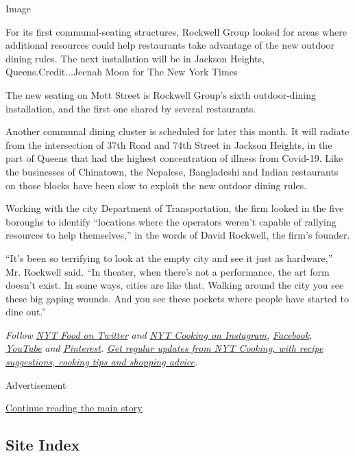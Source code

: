 Image

For its first communal-seating structures, Rockwell Group looked for
areas where additional resources could help restaurants take advantage
of the new outdoor dining rules. The next installation will be in
Jackson Heights, Queens.Credit...Jeenah Moon for The New York Times

The new seating on Mott Street is Rockwell Group's sixth outdoor-dining
installation, and the first one shared by several restaurants.

Another communal dining cluster is scheduled for later this month. It
will radiate from the intersection of 37th Road and 74th Street in
Jackson Heights, in the part of Queens that had the highest
concentration of illness from Covid-19. Like the businesses of
Chinatown, the Nepalese, Bangladeshi and Indian restaurants on those
blocks have been slow to exploit the new outdoor dining rules.

Working with the city Department of Transportation, the firm looked in
the five boroughs to identify ``locations where the operators weren't
capable of rallying resources to help themselves,'' in the words of
David Rockwell, the firm's founder.

``It's been so terrifying to look at the empty city and see it just as
hardware,'' Mr. Rockwell said. ``In theater, when there's not a
performance, the art form doesn't exist. In some ways, cities are like
that. Walking around the city you see these big gaping wounds. And you
see these pockets where people have started to dine out.''

\emph{Follow} \href{https://twitter.com/nytfood}{\emph{NYT Food on
Twitter}} \emph{and}
\href{https://www.instagram.com/nytcooking/}{\emph{NYT Cooking on
Instagram}}\emph{,}
\href{https://www.facebookcorewwwi.onion/nytcooking/}{\emph{Facebook}}\emph{,}
\href{https://www.youtube.com/nytcooking}{\emph{YouTube}} \emph{and}
\href{https://www.pinterest.com/nytcooking/}{\emph{Pinterest}}\emph{.}
\href{https://www.nytimes3xbfgragh.onion/newsletters/cooking}{\emph{Get
regular updates from NYT Cooking, with recipe suggestions, cooking tips
and shopping advice}}\emph{.}

Advertisement

\protect\hyperlink{after-bottom}{Continue reading the main story}

\hypertarget{site-index}{%
\subsection{Site Index}\label{site-index}}

